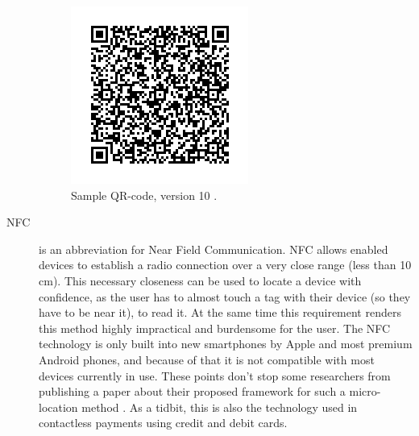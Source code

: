 \begin{description}
	\begin{figure}
		\centering
		\includegraphics{qr-code}
		\caption{Sample QR-code, version 10 \cite{wiki:qr-code}.}
		\label{fig:qr-code}
	\end{figure}

	\item[NFC] is an abbreviation for Near Field Communication. NFC allows enabled devices to establish a radio connection over a very close range (less than 10 cm). This necessary closeness can be used to locate a device with confidence, as the user has to almost touch a tag with their device (so they have to be near it), to read it. At the same time this requirement renders this method highly impractical and burdensome for the user. The NFC technology is only built into new smartphones by Apple and most premium Android phones, and because of that it is not compatible with most devices currently in use. These points don't stop some researchers from publishing a paper about their proposed framework for such a micro-location method \cite{nfc-ulocation}. As a tidbit, this is also the technology used in contactless payments using credit and debit cards.

\end{description}
